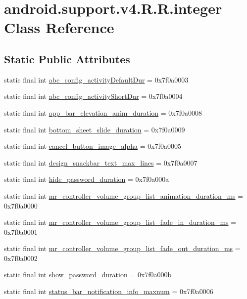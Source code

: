 \hypertarget{classandroid_1_1support_1_1v4_1_1_r_1_1integer}{
\section{android.support.v4.R.R.integer Class Reference}
\label{classandroid_1_1support_1_1v4_1_1_r_1_1integer}
}
\subsection*{Static Public Attributes}
\begin{CompactItemize}
\item 
static final int \hyperlink{classandroid_1_1support_1_1v4_1_1_r_1_1integer_613f712900f688b6b5c6eed369739b07}{abc\_\-config\_\-activityDefaultDur} = 0x7f0a0003
\item 
static final int \hyperlink{classandroid_1_1support_1_1v4_1_1_r_1_1integer_927f22e4f0991a33c3f06f69a82b57b7}{abc\_\-config\_\-activityShortDur} = 0x7f0a0004
\item 
static final int \hyperlink{classandroid_1_1support_1_1v4_1_1_r_1_1integer_f45cb977be108306ff53429ba6e5d08f}{app\_\-bar\_\-elevation\_\-anim\_\-duration} = 0x7f0a0008
\item 
static final int \hyperlink{classandroid_1_1support_1_1v4_1_1_r_1_1integer_228f81756512b8b55bee7a154b343bc5}{bottom\_\-sheet\_\-slide\_\-duration} = 0x7f0a0009
\item 
static final int \hyperlink{classandroid_1_1support_1_1v4_1_1_r_1_1integer_4780483089b4d9582981853f19ef3d87}{cancel\_\-button\_\-image\_\-alpha} = 0x7f0a0005
\item 
static final int \hyperlink{classandroid_1_1support_1_1v4_1_1_r_1_1integer_c44c9c157b824909a5a26a5cba0d61c1}{design\_\-snackbar\_\-text\_\-max\_\-lines} = 0x7f0a0007
\item 
static final int \hyperlink{classandroid_1_1support_1_1v4_1_1_r_1_1integer_59bfce40a21ee9f581558e9d0867924e}{hide\_\-password\_\-duration} = 0x7f0a000a
\item 
static final int \hyperlink{classandroid_1_1support_1_1v4_1_1_r_1_1integer_0d3d00f4387d9e631e6a57b2ff16c926}{mr\_\-controller\_\-volume\_\-group\_\-list\_\-animation\_\-duration\_\-ms} = 0x7f0a0000
\item 
static final int \hyperlink{classandroid_1_1support_1_1v4_1_1_r_1_1integer_f43b9a6c549d7dfa22306d89f8e8f1f3}{mr\_\-controller\_\-volume\_\-group\_\-list\_\-fade\_\-in\_\-duration\_\-ms} = 0x7f0a0001
\item 
static final int \hyperlink{classandroid_1_1support_1_1v4_1_1_r_1_1integer_30c81f4c6e602bf891c6c48f270eb149}{mr\_\-controller\_\-volume\_\-group\_\-list\_\-fade\_\-out\_\-duration\_\-ms} = 0x7f0a0002
\item 
static final int \hyperlink{classandroid_1_1support_1_1v4_1_1_r_1_1integer_428008f622aa896c97e3b3701f45b7a1}{show\_\-password\_\-duration} = 0x7f0a000b
\item 
static final int \hyperlink{classandroid_1_1support_1_1v4_1_1_r_1_1integer_b7ec0d4eb15abd5ac90bccda9c182b55}{status\_\-bar\_\-notification\_\-info\_\-maxnum} = 0x7f0a0006
\end{CompactItemize}


